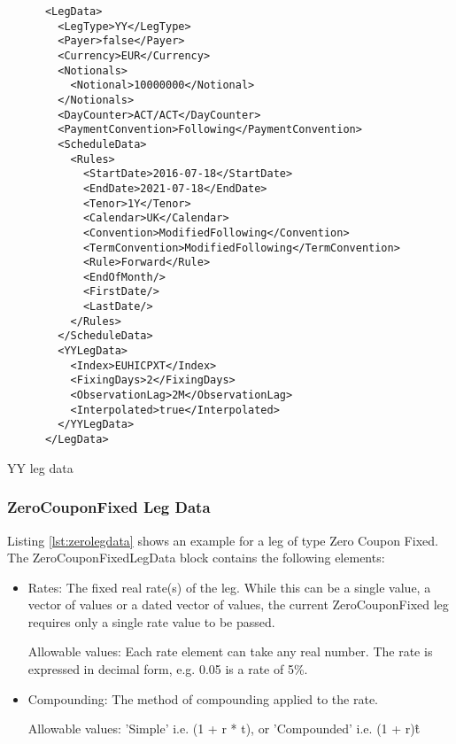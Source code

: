 \begin{listing}[H]
\begin{verbatim}
      <LegData>
        <LegType>YY</LegType>
        <Payer>false</Payer>
        <Currency>EUR</Currency>
        <Notionals>
          <Notional>10000000</Notional>
        </Notionals>
        <DayCounter>ACT/ACT</DayCounter>
        <PaymentConvention>Following</PaymentConvention>
        <ScheduleData>
          <Rules>
            <StartDate>2016-07-18</StartDate>
            <EndDate>2021-07-18</EndDate>
            <Tenor>1Y</Tenor>
            <Calendar>UK</Calendar>
            <Convention>ModifiedFollowing</Convention>
            <TermConvention>ModifiedFollowing</TermConvention>
            <Rule>Forward</Rule>
            <EndOfMonth/>
            <FirstDate/>
            <LastDate/>
          </Rules>
        </ScheduleData>
        <YYLegData>
          <Index>EUHICPXT</Index>
          <FixingDays>2</FixingDays>
          <ObservationLag>2M</ObservationLag>
          <Interpolated>true</Interpolated>
        </YYLegData>
      </LegData>
\end{verbatim}
\caption{YY leg data}
\label{lst:yylegdata}
\end{listing}

\subsubsection{ZeroCouponFixed Leg Data}
\label{ss:zerolegdata}

Listing \ref{lst:zerolegdata} shows an example for a leg of type Zero Coupon Fixed. The ZeroCouponFixedLegData block contains the following
elements:

\begin{itemize}
\item Rates: The fixed real rate(s) of the leg. While this can be a single value, a vector of values or a dated vector of
  values, the current ZeroCouponFixed leg requires only a single rate value to be passed. 
 
 Allowable values: Each rate element can take any  real number. The rate is
  expressed in decimal form, e.g. 0.05 is a rate of 5\%.
\item Compounding: The method of compounding applied to the rate.

Allowable values: 'Simple' i.e. (1 + r * t), or 'Compounded' i.e. (1 + r)\^t

\end{itemize}

